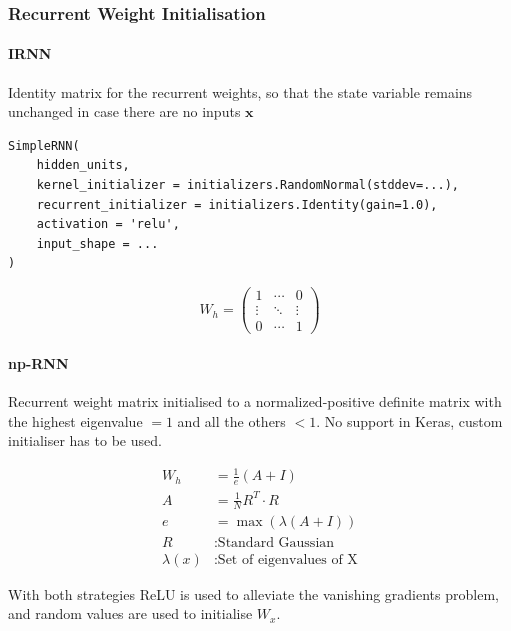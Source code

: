 \documentclass[11pt]{article}
\begin{document}
\subsubsection{Recurrent Weight Initialisation}
\begin{minipage}{0.6\linewidth}
	\paragraph{IRNN} Identity matrix for the recurrent weights, so that the state variable remains unchanged in case there are no inputs $\textbf{x}$
	\begin{verbatim}
SimpleRNN(
	hidden_units,
	kernel_initializer = initializers.RandomNormal(stddev=...),
	recurrent_initializer = initializers.Identity(gain=1.0),
	activation = 'relu',
	input_shape = ...
) 
	\end{verbatim}
\end{minipage}
\quad
\begin{minipage}{0.2\linewidth}
\begin{equation*}
	W_h = \begin{pmatrix}
		1 & \cdots & 0\\
		\vdots & \ddots & \vdots\\
		0 & \cdots & 1
	\end{pmatrix}
\end{equation*}
\end{minipage}

\noindent
\begin{minipage}{0.6\linewidth}
	\paragraph{np-RNN} Recurrent weight matrix initialised to a normalized-positive definite matrix with the highest eigenvalue $= 1$ and all the others $<1$. No support in Keras, custom initialiser has to be used.
\end{minipage}
\quad
\begin{minipage}{0.3\linewidth}
	\begin{align*}
		W_h &= \frac{1}{e}(A+I)\\
		A &= \frac{1}{N}R^T\cdot R\\
		e &= \max\left(\lambda(A+I)\right)\\
		R &: \text{Standard Gaussian}\\
		\lambda(x) &: \text{Set of eigenvalues of X}
	\end{align*}
\end{minipage}
With both strategies ReLU is used to alleviate the vanishing gradients problem, and random values are used to initialise $W_x$.
\end{document}
